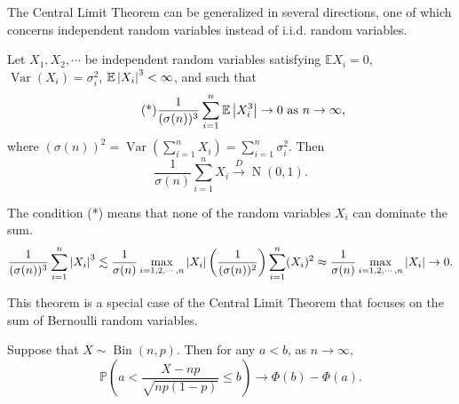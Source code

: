 \documentclass{huhtakm-template-book-v2}
\newcommand{\prob}{\mathbb{P}}
\newcommand{\expect}{\mathbb{E}}
\DeclareMathOperator{\Bin}{Bin}
\DeclareMathOperator{\N}{N}
\DeclareMathOperator{\Var}{Var}
\begin{document}
    The Central Limit Theorem can be generalized in several directions, one of which concerns independent random variables instead of i.i.d. random variables.
    \begin{thm}
        Let $X_{1},X_{2},\cdots$ be independent random variables satisfying $\expect{X_{i}} = 0$, $\Var(X_{i}) = \sigma_{i}^{2}$, $\expect\abs{X_{i}}^{3} < \infty$, and such that
        \begin{equation*}
            \tag{*}
            \frac{1}{(\sigma(n))^{3}}\sum_{i = 1}^{n}\expect\abs{X_{i}^{3}} \to 0 \text{ as }n \to \infty,
        \end{equation*}
        where $(\sigma(n))^{2} = \Var\left(\sum_{i = 1}^{n}X_{i}\right) = \sum_{i = 1}^{n}\sigma_{i}^{2}$. Then
        \begin{equation*}
            \frac{1}{\sigma(n)}\sum_{i = 1}^{n}X_{i} \xrightarrow{D} \N(0,1).
        \end{equation*}
    \end{thm}
    \begin{rem}
        The condition (*) means that none of the random variables $X_{i}$ can dominate the sum.
        \begin{equation*}
            \frac{1}{(\sigma(n))^{3}}\sum_{i = 1}^{n}\left|{X_{i}}\right|^{3}\lesssim\frac{1}{\sigma(n)}\max_{i = 1,2,\cdots,n}\left|{X_{i}}\right|\left(\frac{1}{(\sigma(n))^{2}}\right)\sum_{i = 1}^{n}(X_{i})^{2} \approx \frac{1}{\sigma(n)}\max_{i = 1,2,\cdots,n}\left|{X_{i}}\right| \to 0.
        \end{equation*}
    \end{rem}
    This theorem is a special case of the Central Limit Theorem that focuses on the sum of Bernoulli random variables.
    \begin{thm}
        Suppose that $X \sim \Bin(n,p)$. Then for any $a < b$, as $n \to \infty$,
        \begin{equation*}
            \prob\left(a < \frac{X-np}{\sqrt{np(1-p)}} \leq b\right) \to \Phi(b)-\Phi(a).
        \end{equation*}	
    \end{thm}
\end{document}
